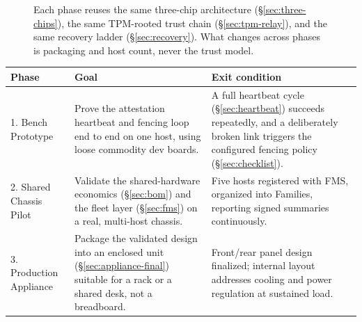 \documentclass[11pt,a4paper]{article}
\newcommand{\figcap}[1]{\caption{#1}}
\begin{document}
\begin{figure}[h!]
\centering
{}
\figcap{Each phase reuses the same three-chip architecture (\S\ref{sec:three-chips}), the same TPM-rooted trust chain (\S\ref{sec:tpm-relay}), and the same recovery ladder (\S\ref{sec:recovery}). What changes across phases is packaging and host count, never the trust model.}
\label{fig:roadmap}
\end{figure}

\begin{center}
\renewcommand{\arraystretch}{1.35}
\small
\begin{tabular}{@{}p{2.4cm}p{6.3cm}p{5.6cm}@{}}
\toprule
\textbf{Phase} & \textbf{Goal} & \textbf{Exit condition} \\
\midrule
1. Bench Prototype & Prove the attestation heartbeat and fencing loop
end to end on one host, using loose commodity dev boards. & A full
heartbeat cycle (\S\ref{sec:heartbeat}) succeeds repeatedly, and a
deliberately broken link triggers the configured fencing policy
(\S\ref{sec:checklist}). \\
2. Shared Chassis Pilot & Validate the shared-hardware economics
(\S\ref{sec:bom}) and the fleet layer (\S\ref{sec:fms}) on a real,
multi-host chassis. & Five hosts registered with FMS, organized into
Families, reporting signed summaries continuously. \\
3. Production Appliance & Package the validated design into an
enclosed unit (\S\ref{sec:appliance-final}) suitable for a rack or a
shared desk, not a breadboard. & Front/rear panel design finalized;
internal layout addresses cooling and power regulation at sustained
load. \\
\bottomrule
\end{tabular}
\end{center}
\end{document}
